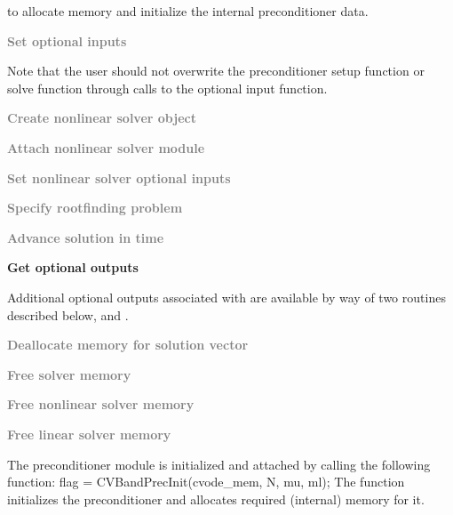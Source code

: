 \begin{Steps}
  to allocate memory and initialize the internal preconditioner data.

\item
  \textcolor{gray}{\bf Set optional inputs}

  Note that the user should not overwrite the preconditioner setup function
  or solve function through calls to the 
  optional input function.

\item
  \textcolor{gray}{\bf Create nonlinear solver object}

\item
  \textcolor{gray}{\bf Attach nonlinear solver module}

\item
  \textcolor{gray}{\bf Set nonlinear solver optional inputs}

\item
  \textcolor{gray}{\bf Specify rootfinding problem}

\item
  \textcolor{gray}{\bf Advance solution in time}

\item
  {\bf Get optional outputs}

  Additional optional outputs associated with {\cvbandpre} are available by
  way of two routines described below,
   and .

\item
  \textcolor{gray}{\bf Deallocate memory for solution vector}

\item
  \textcolor{gray}{\bf Free solver memory}

\item
  \textcolor{gray}{\bf Free nonlinear solver memory}

\item
  \textcolor{gray}{\bf Free linear solver memory}

\end{Steps}
The {\cvbandpre} preconditioner module is initialized and attached
by calling the following function:
{
  flag = CVBandPrecInit(cvode\_mem, N, mu, ml);
}
{
  The function  initializes the {\cvbandpre} preconditioner
  and allocates required (internal) memory for it.
}
